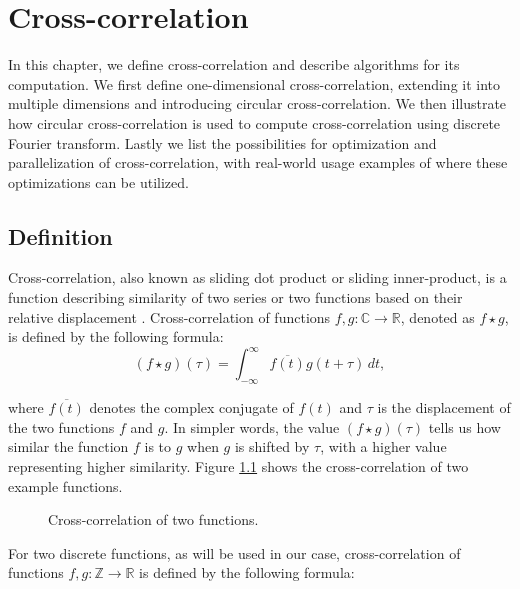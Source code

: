 
\chapter{Cross-correlation}
\label{sec:cross_corr}

In this chapter, we define cross-correlation and describe algorithms for its computation. We first define one-dimensional cross-correlation, extending it into multiple dimensions and introducing circular cross-correlation. We then illustrate how circular cross-correlation is used to compute cross-correlation using discrete Fourier transform. Lastly we list the possibilities for optimization and parallelization of cross-correlation, with real-world usage examples of where these optimizations can be utilized.

\section{Definition}
\label{sec:cross_corr_def}

Cross-correlation, also known as sliding dot product or sliding inner-product, is a function describing similarity of two series or two functions based on their relative displacement \citep{site:wiki_cross_corr}.
Cross-correlation of functions $f,g: \mathbb{C} \rightarrow \mathbb{R}$, denoted as \(f \star g\), is defined by the following formula:
\[
	(f \star g)(\tau) = \int_{-\infty}^{\infty} \overline{f(t)}g(t + \tau) \,dt,
\] 

where \(\overline{f(t)}\) denotes the complex conjugate of \(f(t)\) and \(\tau\) is the displacement of the two functions \(f\) and \(g\). In simpler words, the value \((f \star g)(\tau)\) tells us how similar the function \(f\) is to \(g\) when \(g\) is shifted by \(\tau\), with a higher value representing higher similarity. Figure \ref{fig:cross_corr_example} shows the cross-correlation of two example functions.

\begin{figure}[h]
	\centering
	\def\svgwidth{0.8\textwidth}
	
	\caption{Cross-correlation of two functions. \cite{pic:crosscorr}}
	\label{fig:cross_corr_example}
\end{figure}

For two discrete functions, as will be used in our case, cross-correlation of functions \( f, g : \mathbb{Z} \rightarrow \mathbb{R} \) is defined by the following formula:

